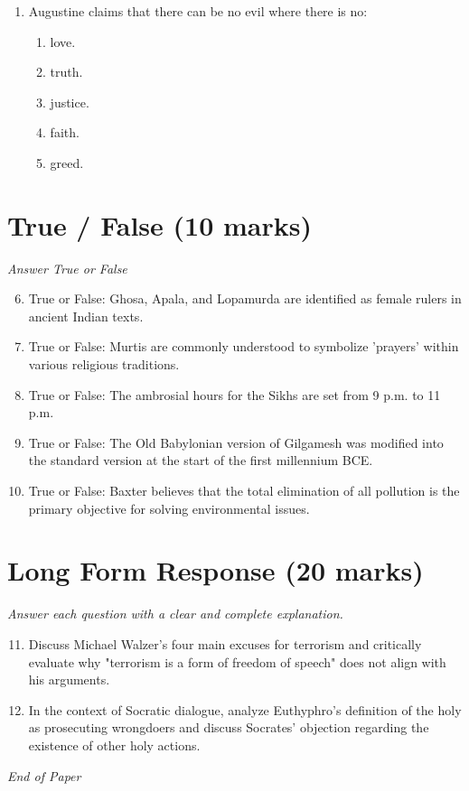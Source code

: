 \documentclass[12pt]{article}
\begin{document}
\begin{enumerate}[label=\arabic*.]
\begin{enumerate}[label=(\alph*)]
    \item Communitarianism.
    \item Anarchist cosmopolitanism.
\end{enumerate}
\item Augustine claims that there can be no evil where there is no:
\begin{enumerate}[label=(\alph*)]
    \item love.
    \item truth.
    \item justice.
    \item faith.
    \item greed.
\end{enumerate}
\end{enumerate}

\section*{True / False (10 marks)}
\textit{Answer True or False}
\begin{enumerate}[label=\arabic*.]
\setcounter{enumi}{5}
\item True or False: Ghosa, Apala, and Lopamurda are identified as female rulers in ancient Indian texts.
\item True or False: Murtis are commonly understood to symbolize 'prayers' within various religious traditions.
\item True or False: The ambrosial hours for the Sikhs are set from 9 p.m. to 11 p.m.
\item True or False: The Old Babylonian version of Gilgamesh was modified into the standard version at the start of the first millennium BCE.
\item True or False: Baxter believes that the total elimination of all pollution is the primary objective for solving environmental issues.
\end{enumerate}

\section*{Long Form Response (20 marks)}
\textit{Answer each question with a clear and complete explanation.}
\begin{enumerate}[label=\arabic*.]
\setcounter{enumi}{10}
\item Discuss Michael Walzer's four main excuses for terrorism and critically evaluate why "terrorism is a form of freedom of speech" does not align with his arguments.
\item In the context of Socratic dialogue, analyze Euthyphro's definition of the holy as prosecuting wrongdoers and discuss Socrates' objection regarding the existence of other holy actions.
\end{enumerate}

\vfill
\noindent\textit{End of Paper}
\end{document}
